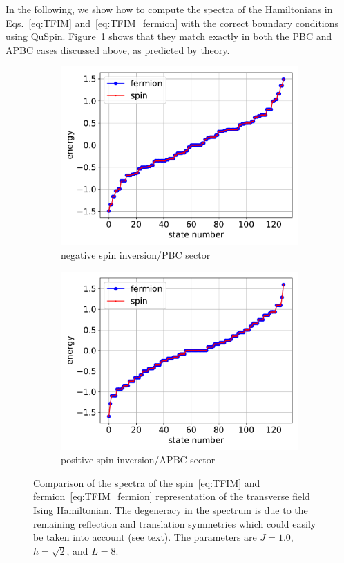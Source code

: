 \documentclass{SciPost}
\newcommand\0{\scalebox{-1}[1]{0}}
\begin{document}
In the following, we show how to compute the spectra of the Hamiltonians in Eqs.~\eqref{eq:TFIM} and~\eqref{eq:TFIM_fermion} with the correct boundary conditions using QuSpin. Figure~\ref{fig:JW} shows that they match exactly in both the PBC and APBC cases discussed above, as predicted by theory.

\begin{figure}[t!]
	\centering
	\begin{subfigure}[a]{0.496\textwidth}
		\includegraphics[width=\textwidth]{JW_PBC.pdf}
		\caption{negative spin inversion/PBC sector}
	\end{subfigure}
	\begin{subfigure}[b]{0.496\textwidth}
		\includegraphics[width=\textwidth]{JW_APBC.pdf}
		\caption{positive spin inversion/APBC sector}
	\end{subfigure}
	\caption{\label{fig:JW} Comparison of the spectra of the spin~\eqref{eq:TFIM} and fermion~\eqref{eq:TFIM_fermion} representation of the transverse field Ising Hamiltonian. The degeneracy in the spectrum is due to the remaining reflection and translation symmetries which could easily be taken into account (see text). The parameters are $J=1.0$, $h=\sqrt{2}$, and $L=8$.}  
\end{figure} 
\end{document}
